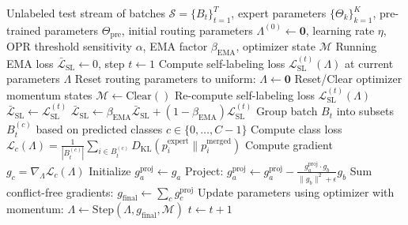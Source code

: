 \documentclass{article}
\theoremstyle{plain}
\theoremstyle{definition}
\theoremstyle{remark}
\begin{document}
\begin{algorithm}[H]
   \caption{PC-Merge with Optimizer and Parameter Resets (OPR)}
   \label{alg:pcmerge}
\begin{algorithmic}[1]
    Unlabeled test stream of batches $\mathcal{S} = \{B_t\}_{t=1}^T$, expert parameters $\{\Theta_k\}_{k=1}^K$, pre-trained parameters $\Theta_{\text{pre}}$, initial routing parameters $\Lambda^{(0)} \leftarrow \mathbf{0}$, learning rate $\eta$, OPR threshold sensitivity $\alpha$, EMA factor $\beta_{\text{EMA}}$, optimizer state $\mathcal{M}$
    Running EMA loss $\bar{\mathcal{L}}_{\text{SL}} \leftarrow 0$, step $t \leftarrow 1$
       \STATE Compute self-labeling loss $\mathcal{L}_{\text{SL}}^{(t)}(\Lambda)$ at current parameters $\Lambda$
           \STATE {}
           \STATE Reset routing parameters to uniform: $\Lambda \leftarrow \mathbf{0}$
           \STATE Reset/Clear optimizer momentum states $\mathcal{M} \leftarrow \text{Clear}()$
           \STATE Re-compute self-labeling loss $\mathcal{L}_{\text{SL}}^{(t)}(\Lambda)$
       \ENDIF
       \STATE {}
           \STATE $\bar{\mathcal{L}}_{\text{SL}} \leftarrow \mathcal{L}_{\text{SL}}^{(t)}$
       \ELSE
           \STATE $\bar{\mathcal{L}}_{\text{SL}} \leftarrow \beta_{\text{EMA}} \bar{\mathcal{L}}_{\text{SL}} + (1 - \beta_{\text{EMA}}) \mathcal{L}_{\text{SL}}^{(t)}$
       \ENDIF
       \STATE {}
       \STATE Group batch $B_t$ into subsets $B_t^{(c)}$ based on predicted classes $c \in \{0, \dots, C-1\}$
           \STATE Compute class loss $\mathcal{L}_c(\Lambda) = \frac{1}{|B_t^{(c)}|} \sum_{i \in B_t^{(c)}} D_{\text{KL}}(p^{\text{expert}}_{i} \parallel p^{\text{merged}}_{i})$
           \STATE Compute gradient $g_c = \nabla_{\Lambda} \mathcal{L}_c(\Lambda)$
       \ENDFOR
       \STATE {}
           \STATE Initialize $g_a^{\text{proj}} \leftarrow g_a$
                   \STATE Project: $g_a^{\text{proj}} \leftarrow g_a^{\text{proj}} - \frac{g_a^{\text{proj}} \cdot g_b}{\|g_b\|^2 + \epsilon} g_b$
               \ENDIF
           \ENDFOR
       \ENDFOR
       \STATE Sum conflict-free gradients: $g_{\text{final}} \leftarrow \sum_{c} g_c^{\text{proj}}$
       \STATE Update parameters using optimizer with momentum: $\Lambda \leftarrow \text{Step}(\Lambda, g_{\text{final}}, \mathcal{M})$
       \STATE $t \leftarrow t + 1$
   \ENDFOR
\end{algorithmic}
\end{algorithm}
\end{document}
